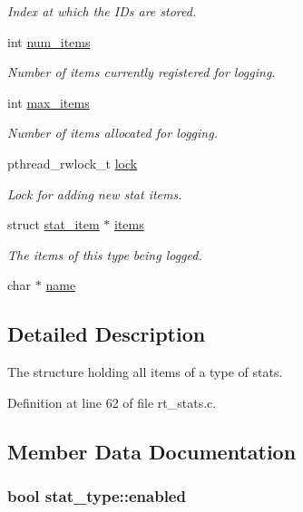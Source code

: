 \begin{DoxyCompactItemize}
\begin{DoxyCompactList}\small\item\em Index at which the I\-Ds are stored. \end{DoxyCompactList}\item 
int \hyperlink{structstat__type_a58e7d3ee8ef48ab267367fc3266a9113}{num\-\_\-items}
\begin{DoxyCompactList}\small\item\em Number of items currently registered for logging. \end{DoxyCompactList}\item 
int \hyperlink{structstat__type_af697600ffa976b8c4530f7e20e817023}{max\-\_\-items}
\begin{DoxyCompactList}\small\item\em Number of items allocated for logging. \end{DoxyCompactList}\item 
pthread\-\_\-rwlock\-\_\-t \hyperlink{structstat__type_a22f632f9d74f51d3bd8d95a5c8b2536e}{lock}
\begin{DoxyCompactList}\small\item\em Lock for adding new stat items. \end{DoxyCompactList}\item 
struct \hyperlink{structstat__item}{stat\-\_\-item} $\ast$ \hyperlink{structstat__type_a15ccf932c19f6e6b07a3575a956cfacd}{items}
\begin{DoxyCompactList}\small\item\em The items of this type being logged. \end{DoxyCompactList}\item 
char $\ast$ \hyperlink{structstat__type_ae4e7f67c4950bcfbe35ba672bcfd6923}{name}
\end{DoxyCompactItemize}


\subsection{Detailed Description}
The structure holding all items of a type of stats. 

Definition at line 62 of file rt\-\_\-stats.\-c.



\subsection{Member Data Documentation}
\hypertarget{structstat__type_a3c657ea7ad6abd10ce5f50feafd7dae0}{
\subsubsection[{enabled}]{\setlength{\rightskip}{0pt plus 5cm}bool stat\-\_\-type\-::enabled}}\label{structstat__type_a3c657ea7ad6abd10ce5f50feafd7dae0}


